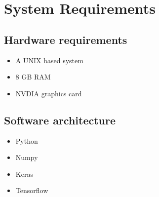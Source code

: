 \chapter{System Requirements}

\section{Hardware requirements}

\begin{itemize}
    \item A UNIX based system
    \item 8 GB RAM
    \item NVDIA graphics card
\end{itemize}

\section{Software architecture}

\begin{itemize}
    \item Python
    \item Numpy
    \item Keras
    \item Tensorflow
\end{itemize}
